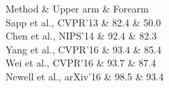 Method & Upper arm & Forearm \\

Sapp et al., CVPR'13  & 82.4 & 50.0 \\

Chen et al., NIPS'14  & 92.4 & 82.3 \\

Yang et al., CVPR'16  & 93.4 & 85.4 \\

Wei et al., CVPR'16  & 93.7 & 87.4 \\

Newell et al., arXiv'16  & 98.5 & 93.4 \\

